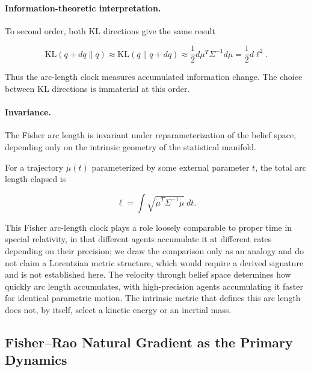 \documentclass[12pt]{article}
\begin{document}
\paragraph{Information-theoretic interpretation.} To second order, both KL directions give the same result

\begin{equation}
\text{KL}(q + dq \| q) \approx \text{KL}(q \| q + dq) \approx \frac{1}{2} d\mu^T \Sigma^{-1} d\mu = \frac{1}{2} d\ell^2 .
\end{equation}

Thus the arc-length clock measures accumulated information change. The choice between KL directions is immaterial at this order.

\paragraph{Invariance.} The Fisher arc length is invariant under reparameterization of the belief space, depending only on the intrinsic geometry of the statistical manifold.

For a trajectory $\mu(t)$ parameterized by some external parameter $t$, the total arc length elapsed is

\begin{equation}
\ell = \int \sqrt{\dot{\mu}^T \Sigma^{-1} \dot{\mu}}\ dt .
\end{equation}

This Fisher arc-length clock plays a role loosely comparable to proper time in special relativity, in that different agents accumulate it at different rates depending on their precision; we draw the comparison only as an analogy and do not claim a Lorentzian metric structure, which would require a derived signature and is not established here. The velocity through belief space determines how quickly arc length accumulates, with high-precision agents accumulating it faster for identical parametric motion. The intrinsic metric that defines this arc length does not, by itself, select a kinetic energy or an inertial mass.

\subsection{Fisher--Rao Natural Gradient as the Primary Dynamics}
\label{sec:natural_gradient_dynamics}
\end{document}
